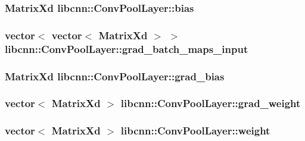 \hypertarget{classlibcnn_1_1_conv_pool_layer_a8b537b16fb08d935f442360f564b9403}{
\subsubsection[{bias}]{\setlength{\rightskip}{0pt plus 5cm}\-Matrix\-Xd {\bf libcnn\-::\-Conv\-Pool\-Layer\-::bias}}}\label{classlibcnn_1_1_conv_pool_layer_a8b537b16fb08d935f442360f564b9403}
\hypertarget{classlibcnn_1_1_conv_pool_layer_a519dad823100b62bc93738477a593a6d}{
\subsubsection[{grad\-\_\-batch\-\_\-maps\-\_\-input}]{\setlength{\rightskip}{0pt plus 5cm}vector$<$ vector$<$ \-Matrix\-Xd $>$ $>$ {\bf libcnn\-::\-Conv\-Pool\-Layer\-::grad\-\_\-batch\-\_\-maps\-\_\-input}}}\label{classlibcnn_1_1_conv_pool_layer_a519dad823100b62bc93738477a593a6d}
\hypertarget{classlibcnn_1_1_conv_pool_layer_a4bf6b594b2a91f6bd8291ff8e446e4ba}{
\subsubsection[{grad\-\_\-bias}]{\setlength{\rightskip}{0pt plus 5cm}\-Matrix\-Xd {\bf libcnn\-::\-Conv\-Pool\-Layer\-::grad\-\_\-bias}}}\label{classlibcnn_1_1_conv_pool_layer_a4bf6b594b2a91f6bd8291ff8e446e4ba}
\hypertarget{classlibcnn_1_1_conv_pool_layer_a2728855bb4a00c4800ff4a912ef21e85}{
\subsubsection[{grad\-\_\-weight}]{\setlength{\rightskip}{0pt plus 5cm}vector$<$ \-Matrix\-Xd $>$ {\bf libcnn\-::\-Conv\-Pool\-Layer\-::grad\-\_\-weight}}}\label{classlibcnn_1_1_conv_pool_layer_a2728855bb4a00c4800ff4a912ef21e85}
\hypertarget{classlibcnn_1_1_conv_pool_layer_ad9b3b0b372858e32e075565beec5226a}{
\subsubsection[{weight}]{\setlength{\rightskip}{0pt plus 5cm}vector$<$ \-Matrix\-Xd $>$ {\bf libcnn\-::\-Conv\-Pool\-Layer\-::weight}}}\label{classlibcnn_1_1_conv_pool_layer_ad9b3b0b372858e32e075565beec5226a}


